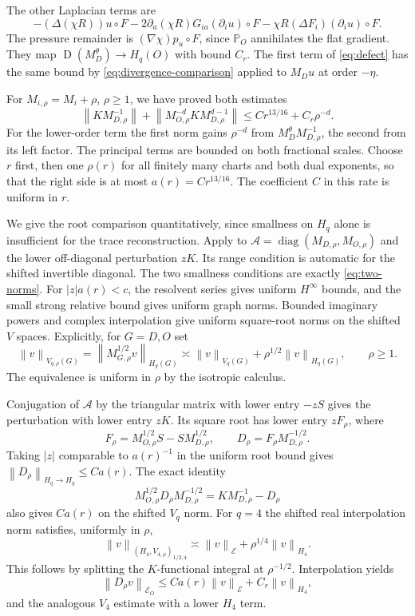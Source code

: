 \documentclass[11pt]{article}
\numberwithin{equation}{section}
\theoremstyle{remark}
\newcommand{\PP}{\mathbb P}
\newcommand{\diag}{\operatorname{diag}}
\newcommand{\calE}{\mathcal E}
\newcommand{\norm}[1]{\left\lVert#1\right\rVert}
\DeclareMathOperator{\Dom}{D}
\begin{document}
The other Laplacian terms are
\[
 -(\Delta(\chi R))u\circ F
 -2\partial_a(\chi R)G_{ia}(\partial_i u)\circ F
 -\chi R(\Delta F_i)(\partial_i u)\circ F.
\]
The pressure remainder is $(\nabla\chi)p_u\circ F$, since
$\PP_O$ annihilates the flat gradient. They map
$\Dom(M_D^\theta)\to H_q(O)$ with bound $C_r$. The first term of
\eqref{eq:defect} has the same bound by
\eqref{eq:divergence-comparison} applied to $M_Du$ at order $-\eta$.

For $M_{i,\rho}=M_i+\rho$, $\rho\geq1$, we have proved both estimates
\begin{equation}\label{eq:two-norms}
 \norm{KM_{D,\rho}^{-1}}+
 \norm{M_{O,\rho}^{-d}KM_{D,\rho}^{d-1}}
 \leq Cr^{13/16}+C_r\rho^{-d}.
\end{equation}
For the lower-order term the first norm gains $\rho^{-d}$ from
$M_D^\theta M_{D,\rho}^{-1}$, the second from its left factor.
The principal terms are bounded on both fractional scales. Choose
$r$ first, then one $\rho(r)$ for all finitely many charts and both
dual exponents, so that the right side is at most
$a(r)=Cr^{13/16}$. The coefficient $C$ in this rate is uniform in $r$.

We give the root comparison quantitatively, since smallness on $H_q$
alone is insufficient for the trace reconstruction. Apply
\cite[Theorem 6.1, Lemma 6.2]{KKW} to
$\mathcal A=\diag(M_{D,\rho},M_{O,\rho})$ and the lower
off-diagonal perturbation $zK$. Its range condition is automatic
for the shifted invertible diagonal. The two smallness conditions
are exactly \eqref{eq:two-norms}. For $|z|a(r)<c$, the resolvent
series gives uniform $H^\infty$ bounds, and the small strong relative
bound gives uniform graph norms. Bounded imaginary powers and complex
interpolation \cite[Proposition 2.2]{KKW} give uniform square-root
norms on the shifted $V$ spaces. Explicitly, for $G=D,O$ set
\[
 \norm{v}_{V_{q,\rho}(G)}=\norm{M_{G,\rho}^{1/2}v}_{H_q(G)}
 \asymp\norm{v}_{V_q(G)}+\rho^{1/2}\norm{v}_{H_q(G)},\qquad\rho\geq1.
\]
The equivalence is uniform in $\rho$ by the isotropic calculus.

Conjugation of $\mathcal A$ by the triangular matrix with lower entry
$-zS$ gives the perturbation with lower entry $zK$. Its square root
has lower entry $zF_\rho$, where
\[
 F_\rho=M_{O,\rho}^{1/2}S-SM_{D,\rho}^{1/2},\qquad
 D_\rho=F_\rho M_{D,\rho}^{-1/2}.
\]
Taking $|z|$ comparable to $a(r)^{-1}$ in the uniform root bound gives
$\norm{D_\rho}_{H_q\to H_q}\leq Ca(r)$. The exact identity
\begin{equation}\label{eq:root-V}
 M_{O,\rho}^{1/2}D_\rho M_{D,\rho}^{-1/2}
 =KM_{D,\rho}^{-1}-D_\rho
\end{equation}
also gives $Ca(r)$ on the shifted $V_q$ norm. For $q=4$ the shifted
real interpolation norm satisfies, uniformly in $\rho$,
\[
 \norm{v}_{(H_4,V_{4,\rho})_{1/2,4}}
 \asymp\norm{v}_{\calE}+\rho^{1/4}\norm{v}_{H_4}.
\]
This follows by splitting the $K$-functional integral at
$\rho^{-1/2}$. Interpolation yields
\begin{equation}\label{eq:root-E}
 \norm{D_\rho v}_{\calE_O}
 \leq Ca(r)\norm{v}_{\calE}+C_r\norm{v}_{H_4},
\end{equation}
and the analogous $V_4$ estimate with a lower $H_4$ term.
\end{document}
